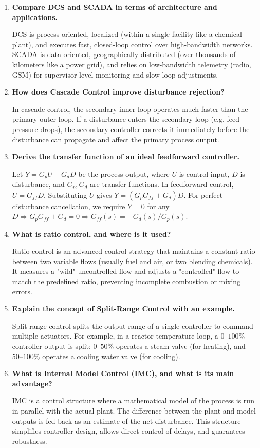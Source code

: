 \documentclass[12pt,a4paper]{article}
\newcommand{\Q}[1]{\textbf{#1}\par\noindent\ignorespaces}
\begin{document}
\begin{tcolorbox}[exambox, title={\textbf{Frequently Asked / Viva Questions}}]
\begin{enumerate}[leftmargin=*, itemsep=4pt]
  \item \Q{Compare DCS and SCADA in terms of architecture and applications.}
    DCS is process-oriented, localized (within a single facility like a chemical plant), and executes fast, closed-loop control over high-bandwidth networks. SCADA is data-oriented, geographically distributed (over thousands of kilometers like a power grid), and relies on low-bandwidth telemetry (radio, GSM) for supervisor-level monitoring and slow-loop adjustments.
  \item \Q{How does Cascade Control improve disturbance rejection?}
    In cascade control, the secondary inner loop operates much faster than the primary outer loop. If a disturbance enters the secondary loop (e.g. feed pressure drops), the secondary controller corrects it immediately before the disturbance can propagate and affect the primary process output.
  \item \Q{Derive the transfer function of an ideal feedforward controller.}
    Let $Y = G_p U + G_d D$ be the process output, where $U$ is control input, $D$ is disturbance, and $G_p, G_d$ are transfer functions. In feedforward control, $U = G_{ff} D$. Substituting $U$ gives $Y = (G_p G_{ff} + G_d) D$. For perfect disturbance cancellation, we require $Y=0$ for any $D \Rightarrow G_p G_{ff} + G_d = 0 \Rightarrow G_{ff}(s) = -G_d(s)/G_p(s)$.
  \item \Q{What is ratio control, and where is it used?}
    Ratio control is an advanced control strategy that maintains a constant ratio between two variable flows (usually fuel and air, or two blending chemicals). It measures a "wild" uncontrolled flow and adjusts a "controlled" flow to match the predefined ratio, preventing incomplete combustion or mixing errors.
  \item \Q{Explain the concept of Split-Range Control with an example.}
    Split-range control splits the output range of a single controller to command multiple actuators. For example, in a reactor temperature loop, a $0\text{--}100\%$ controller output is split: $0\text{--}50\%$ operates a steam valve (for heating), and $50\text{--}100\%$ operates a cooling water valve (for cooling).
  \item \Q{What is Internal Model Control (IMC), and what is its main advantage?}
    IMC is a control structure where a mathematical model of the process is run in parallel with the actual plant. The difference between the plant and model outputs is fed back as an estimate of the net disturbance. This structure simplifies controller design, allows direct control of delays, and guarantees robustness.

\end{enumerate}
\end{tcolorbox}
\end{document}
